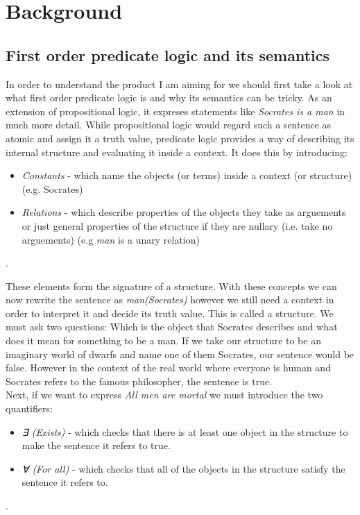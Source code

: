 \documentclass{article}
\begin{document}
\section{Background}
	\subsection{First order predicate logic and its semantics}
In order to understand the product I am aiming for we should first take a look at what first order predicate logic is and why its semantics can be tricky. As an extension of propositional logic, it expreses statements like \emph{Socrates is a man} in much more detail. While propositional logic would regard such a sentence as atomic and assign it a truth value, predicate logic provides a way of describing its internal structure and evaluating it inside a context. It does this by introducing:

	\begin{itemize}
	\item \emph{Constants} - which name the objects (or terms) inside a context (or structure) (e.g. Socrates)
	\item \emph{Relations} - which describe properties of the objects they take as arguements or just general properties of the structure if they are nullary (i.e. take no arguements) (e.g \emph{man} is a unary relation)
	\end{itemize}.

\noindent These elements form the signature of a structure. With these concepts we can now rewrite the sentence as \emph{man(Socrates)} however we still need a context in order to interpret it and decide its truth value. This is called a structure. We must ask two questions: Which is the object that Socrates describes and what does it mean for something to be a man. If we take our structure to be an imaginary world of dwarfs and name one of them Socrates, our sentence would be false. However in the context of the real world where everyone is human and Socrates refers to the famous philosopher, the sentence is true.\\

\noindent Next, if we want to express \emph{All men are mortal} we must introduce the two quantifiers:

	\begin{itemize}
	\item \emph{∃ (Exists)} - which checks that there is at least one object in the structure to make the sentence it refers to true.
	\item \emph{∀ (For all)} - which checks that all of the objects in the structure satisfy the sentence it refers to.
	\end{itemize}.
\end{document}

